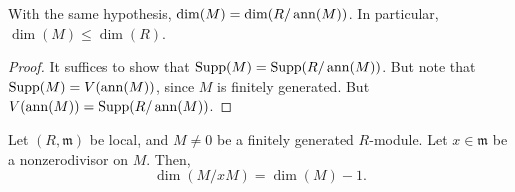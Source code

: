 \documentclass[12pt]{article}
\begin{document}
\begin{cor}
	With the same hypothesis, $\dim(M) = \dim(R/\operatorname{ann}(M))$. \newline
	In particular, $\dim(M) \le \dim(R)$.
\end{cor}
\begin{proof} 
	It suffices to show that $\operatorname{Supp}(M) = \operatorname{Supp}(R/\operatorname{ann}(M))$. But note that $\operatorname{Supp}(M) = V(\operatorname{ann}(M))$, since $M$ is finitely generated. But $V(\operatorname{ann}(M)) = \operatorname{Supp}(R/\operatorname{ann}(M))$.
\end{proof}

\begin{thm}
	Let $(R, \mathfrak{m})$ be local, and $M \neq 0$ be a finitely generated $R$-module. \newline
	Let $x \in \mathfrak{m}$ be a nonzerodivisor on $M$. Then,
	\begin{equation*} 
		\dim(M/xM) = \dim(M) - 1.
	\end{equation*}
\end{thm}
\end{document}
